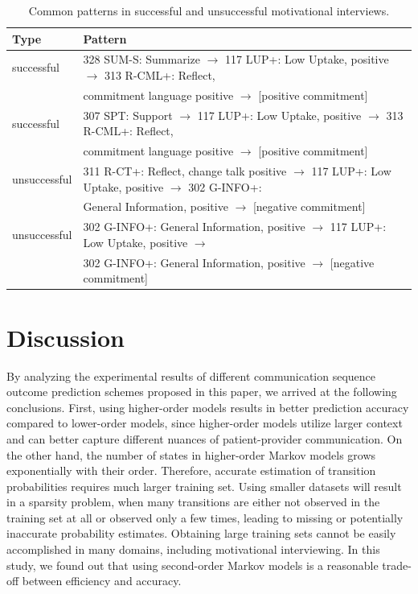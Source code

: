 \documentclass{amia_summit_2018}
\begin{document}
\begin{table}[h]
\centering
\caption{Common patterns in successful and unsuccessful motivational interviews.}
\label{tab:common_patterns}
  \begin{tabular}{|l|l|}
  \hline
   \textbf{Type} & \textbf{Pattern} \\ \hline      
successful & 328 SUM-S: Summarize $\rightarrow $ 117 LUP+: Low Uptake, positive $\rightarrow $ 313 R-CML+: Reflect, \\ 
& commitment language positive $\rightarrow $ [positive commitment] \\\hline
successful & 307 SPT: Support $\rightarrow $ 117 LUP+: Low Uptake, positive $\rightarrow $ 313 R-CML+: Reflect, \\
& commitment language positive $\rightarrow $ [positive commitment] \\\hline
unsuccessful & 311 R-CT+: Reflect, change talk positive $\rightarrow $ 117 LUP+: Low Uptake, positive $\rightarrow $ 302 G-INFO+:  \\
& General Information, positive $\rightarrow $ [negative commitment] \\\hline
unsuccessful & 302 G-INFO+: General Information, positive $\rightarrow $ 117 LUP+: Low Uptake, positive $\rightarrow $  \\
& 302 G-INFO+: General Information, positive $\rightarrow $ [negative commitment] \\\hline
  \end{tabular}
\end{table} 

\section*{Discussion}
By analyzing the experimental results of different communication sequence outcome prediction schemes proposed in this paper, we arrived at the following conclusions. First, using higher-order models results in better prediction accuracy compared to lower-order models, since higher-order models utilize larger context and can better capture different nuances of patient-provider communication. On the other hand, the number of states in higher-order Markov models grows exponentially with their order. Therefore, accurate estimation of transition probabilities requires much larger training set. Using smaller datasets will result in a sparsity problem, when many transitions are either not observed in the training set at all or observed only a few times, leading to missing or potentially inaccurate probability estimates. Obtaining large training sets cannot be easily accomplished in many domains, including motivational interviewing. In this study, we found out that using second-order Markov models is a reasonable trade-off between efficiency and accuracy.  
\end{document}
